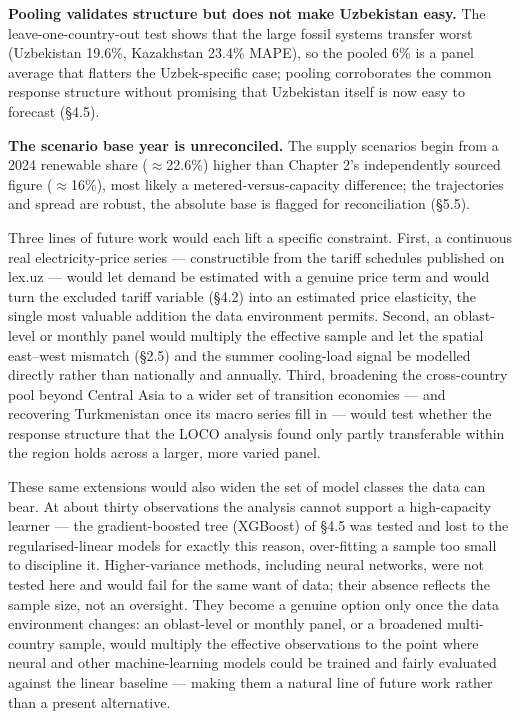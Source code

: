 \documentclass[10pt,twocolumn]{article}
\begin{document}
\textbf{Pooling validates structure but does not make Uzbekistan easy.} The leave-one-country-out test shows that the large fossil systems transfer worst (Uzbekistan 19.6\%, Kazakhstan 23.4\% MAPE), so the pooled 6\% is a panel average that flatters the Uzbek-specific case; pooling corroborates the common response structure without promising that Uzbekistan itself is now easy to forecast (\S{}4.5).

\textbf{The scenario base year is unreconciled.} The supply scenarios begin from a 2024 renewable share ($\approx$22.6\%) higher than Chapter 2's independently sourced figure ($\approx$16\%), most likely a metered-versus-capacity difference; the trajectories and spread are robust, the absolute base is flagged for reconciliation (\S{}5.5).

Three lines of future work would each lift a specific constraint. First, a continuous real electricity-price series --- constructible from the tariff schedules published on lex.uz --- would let demand be estimated with a genuine price term and would turn the excluded tariff variable (\S{}4.2) into an estimated price elasticity, the single most valuable addition the data environment permits. Second, an oblast-level or monthly panel would multiply the effective sample and let the spatial east--west mismatch (\S{}2.5) and the summer cooling-load signal be modelled directly rather than nationally and annually. Third, broadening the cross-country pool beyond Central Asia to a wider set of transition economies --- and recovering Turkmenistan once its macro series fill in --- would test whether the response structure that the LOCO analysis found only partly transferable within the region holds across a larger, more varied panel.

These same extensions would also widen the set of model classes the data can bear. At about thirty observations the analysis cannot support a high-capacity learner --- the gradient-boosted tree (XGBoost) of \S{}4.5 was tested and lost to the regularised-linear models for exactly this reason, over-fitting a sample too small to discipline it. Higher-variance methods, including neural networks, were not tested here and would fail for the same want of data; their absence reflects the sample size, not an oversight. They become a genuine option only once the data environment changes: an oblast-level or monthly panel, or a broadened multi-country sample, would multiply the effective observations to the point where neural and other machine-learning models could be trained and fairly evaluated against the linear baseline --- making them a natural line of future work rather than a present alternative.
\end{document}
